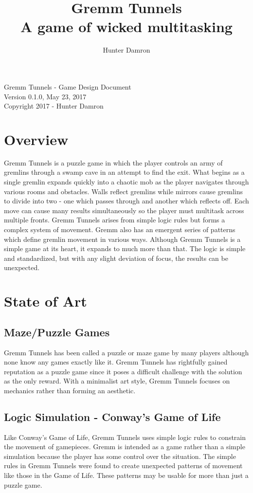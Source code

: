 \documentclass{scrreprt}
\title{
	Gremm Tunnels \\
	\large A game of wicked multitasking
}
\author{Hunter Damron}
\date{\releasedate}
\newcommand{\version}{0.1.0}
\newcommand{\releasedate}{May 23, 2017}
\begin{document}
	\maketitle
	
	\null\vfill
	\noindent
	Gremm Tunnels - Game Design Document \\
	Version \version, \releasedate \\
	Copyright 2017 - Hunter Damron \\
	\newpage

	\tableofcontents
	\newpage
	
	\chapter{Overview}
		Gremm Tunnels is a puzzle game in which the player controls an army of gremlins through a swamp cave in an attempt to find the exit. What begins as a single gremlin expands quickly into a chaotic mob as the player navigates through various rooms and obstacles. Walls reflect gremlins while mirrors cause gremlins to divide into two - one which passes through and another which reflects off. Each move can cause many results simultaneously so the player must multitask across multiple fronts. Gremm Tunnels arises from simple logic rules but forms a complex system of movement. Gremm also has an emergent series of patterns which define gremlin movement in various ways. Although Gremm Tunnels is a simple game at its heart, it expands to much more than that. The logic is simple and standardized, but with any slight deviation of focus, the results can be unexpected. 
	
	\chapter{State of Art}
		
		\section{Maze/Puzzle Games}
			Gremm Tunnels has been called a puzzle or maze game by many players although none know any games exactly like it. Gremm Tunnels has rightfully gained reputation as a puzzle game since it poses a difficult challenge with the solution as the only reward. With a minimalist art style, Gremm Tunnels focuses on mechanics rather than forming an aesthetic.
			
		\section{Logic Simulation - Conway's Game of Life}
			Like Conway's Game of Life, Gremm Tunnels uses simple logic rules to constrain the movement of gamepieces. Gremm is intended as a game rather than a simple simulation because the player has some control over the situation. The simple rules in Gremm Tunnels were found to create unexpected patterns of movement like those in the Game of Life. These patterns may be usable for more than just a puzzle game.
		
\end{document}
